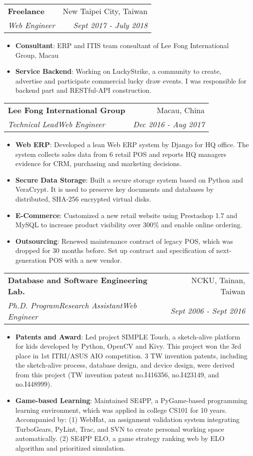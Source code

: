 \documentclass[a4paper,11pt]{article}
\makeatletter
\newcommand{\resumeItem}[2]{
  \item{
    \textbf{\small#1}{: \small#2 \vspace{-2pt}}
  }
}
\newcommand{\resumeSubheading}[4]{
  \vspace{-1pt}\item
    \begin{tabular*}{0.97\textwidth}{l@{\extracolsep{\fill}}r}
      \textbf{#1} & #2 \\
      \textit{#3} & \textit{ #4} \\
    \end{tabular*}\vspace{-5pt}
}
\newcommand{\resumeItemListStart}{\begin{itemize}}
\newcommand{\resumeItemListEnd}{\end{itemize}\vspace{-5pt}}
\newcommand\smalldiv{\smash{\raisebox{0.29ex}{\scalebox{0.8}{/}}}}
\makeatother
\begin{document}
    \resumeSubheading
      {Freelance}{New Taipei City, Taiwan}
      {Web Engineer}{Sept 2017 - July 2018}
      \resumeItemListStart
        \resumeItem{Consultant}
          {ERP and IT\smalldiv IS team consultant of Lee Fong International Group, Macau}
        \resumeItem{Service Backend}
          {Working on LuckyStrike, a community to create, advertise and participate commercial lucky draw events. I was responsible for backend part and RESTful-API construction.}
      \resumeItemListEnd

    \resumeSubheading
      {Lee Fong International Group}{Macau, China}
      {Technical Lead\smalldiv Web Engineer}{Dec 2016 - Aug 2017}
      \resumeItemListStart
        \resumeItem{Web ERP}
          {Developed a lean Web ERP system by Django for HQ office. The system collects sales data from 6 retail POS and reports HQ managers evidence for CRM, purchasing and marketing decisions.}
        \resumeItem{Secure Data Storage}
          {Built a secure storage system based on Python and VeraCrypt. It is used to preserve key documents and databases by distributed, SHA-256 encrypted virtual disks.}
        \resumeItem{E-Commerce}
          {Customized a new retail website using Prestashop 1.7 and MySQL to increase product visibility over 300\% and enable online ordering.}
        \resumeItem{Outsourcing}
          {Renewed maintenance contract of legacy POS, which was dropped for 30 months before. Set up contract and specification of next-generation POS with a new vendor.}
      \resumeItemListEnd

    \resumeSubheading
      {Database and Software Engineering Lab.}{NCKU, Tainan, Taiwan}
      {Ph.D. Program\smalldiv Research Assistant\smalldiv Web Engineer}{Sept 2006 - Sept 2016}
      \resumeItemListStart
        \resumeItem{Patents and Award}
          {Led project SIMPLE Touch, a sketch-alive platform for kids developed by Python, OpenCV and Kivy. This project won the 3rd place in 1st ITRI/ASUS AIO competition. 3 TW invention patents, including the sketch-alive process, database design, and device design, were derived from this project (TW invention patent no.I416356, no.I423149, and no.I448999).}
        \resumeItem{Game-based Learning}
          {Maintained SE4PP, a PyGame-based programming learning environment, which was applied in college CS101 for 10 years. Accompanied by: (1) WebHat, an assignment validation system integrating TurboGears, PyLint, Trac, and SVN to create personal working space automatically. (2) SE4PP ELO, a game strategy ranking web by ELO algorithm and prioritized simulation.}
      \resumeItemListEnd
\end{document}
